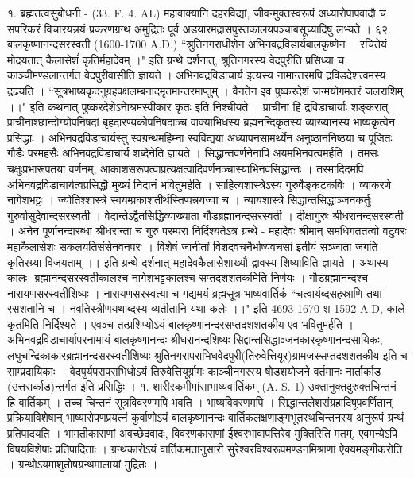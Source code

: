 १. ब्रह्मतत्वसुबोधनी - (33. F. 4. AL)
महावाक्यानि दहरविद्यां, जीवन्मुक्तस्वरूपं अध्यारोपापवादौ च सपरिकरं विचारयन्नयं प्रकरणग्रन्थ अमुद्रितः पूर्व अडयारमद्रासपुस्तकालयपञ्चाबसूच्यादिषु लभ्यते ।
६२. बालकृष्णानन्दसरस्वती (1600-1700 A.D.)
``श्रुतिनगराधीशेन अभिनवद्रविडार्यबालकृष्णेन । रचितेयं मोदयतात् कैलासेशंं कृतिर्महादेवम् ।" इति ग्रन्थे दर्शनात्, श्रुतिनगरस्य वेदपुरीति प्रसिध्या च काञ्चीमण्डलान्तर्गत वेदपुरीवासीति ज्ञायते । अभिनवद्रविडाचार्य इत्यस्य नामान्तरमपि द्रविडदेशत्वमस्य द्रढयति । 
``सूत्रभाष्यकृदनुग्रहपक्षलम्बनादमृतमान्तरमाप्तुम् ।
वैनतेन इव पुष्करदेशं जन्मयोगमतरं जलराशिम् ।।"
इति कथनात् पुष्करदेशेऽनेाश्रमस्वीकार कृतः इति निश्चीयते ।
प्राचीना हि द्रविडाचार्याः शङ्करात् प्राचीनाश्छान्दोग्योपनिषदां बृहदारण्यकोपनिषदाञ्च वाक्याभिधस्य ब्रह्मनन्दिकृतस्य व्याख्यानस्य भाष्यकृत्वेन प्रसिद्धाः । अभिनवद्रविडाचार्यस्तु स्वग्रन्थमहिम्ना स्वविद्यया अध्यापनसामर्थ्येन अनुष्ठाननिष्ठया च पूजितः गौडैः परमहंसैः अभिनवद्रविडाचार्य शब्देनेति ज्ञायते । सिद्धान्तवर्णनेनापि अयमभिनवत्वमर्हति । तमसः चक्षुःप्रभारूपतया वर्णनम्, आकाशसरूपत्वाप्रत्यक्षत्वादिवर्णनञ्चास्याभिनवसिद्धान्तः । तस्मादिदमपि अभिनवद्रविडाचार्यत्वप्रसिद्धौ मुख्यं निदानं भवितुमर्हति ।
साहित्यशास्त्रेऽस्य गुरुर्वेङ्कटकविः । व्याकरणे नागेशभट्टः । ज्योतिश्शास्त्रे स्वयम्प्रकाशतीर्थस्तिप्पन्नयज्वा च । न्यायशास्त्रे सिद्धान्तसिद्धाञ्जनकर्तुः गुरुर्वासुदेवान्दसरस्वती । वेदान्तेऽद्वैतसिद्धिव्याख्याता गौडब्रह्मानन्दसरस्वती । दीक्षागुरुः श्रीधरानन्दसरस्वती । अनेन पूर्णानन्दारब्धा श्रीधरान्ता च गुरु परम्परा निर्दिश्यतेऽत्र ग्रन्थे -
महादेवः श्रीमान् समधिगततत्वो वटुवरः 
महाकैलासेशः सकलयतिसंसेनवनपरः ।
विशेषं जानीतां विशदवचनैर्भाष्यवचसां
इतीयं सञ्जाता जगति कृतिरग्र्या विजयताम् ।।
इति ग्रन्थे दर्शनात् महादेवकैलासेशाख्यौ द्वावस्य शिष्याविति ज्ञायते ।
अथास्य कालः-
ब्रह्मानन्दसरस्वतीकालश्च नागेशभट्टकालश्च सप्तदशशतकमिति निर्णयः । गौडब्रह्मानन्दश्च नारायणसरस्वतीशिष्यः । नारायणसरस्वत्या च गद्यमयं व्रह्मसूत्र भाष्यवार्तिकं ``चत्वार्यब्दसहस्राणि तथा रसशतानि च । नवतिस्त्रीणयथाब्दस्य व्यतीतानि यथा कलेः ।।" इति 4693-1670 श 1592 A.D, काले कृतमिति निर्दिश्यते । एवञ्च तत्प्रशिप्योऽयं बालकृष्णानन्दरसप्तदशशतकीय एव भवितुमर्हति ।
अभिनवद्रविडाचार्यापरनामायं बालकृष्णानन्दः श्रीधरानन्दशिष्यः सिद्दान्तसिद्धाञ्जनकारकृष्णानन्दसायिकः, लघुचन्द्रिकाकारब्रह्मानन्दसरस्वतीशिष्यः श्रुतिनगरापराभिधवेदपुरी(तिरुवेत्तियूर)ग्रामजस्सप्तदशशतकीय इति च साम्प्रदायिकाः । वेदपुर्यपरापराभिधोऽयं तिरुवेत्तियूर्ग्रामः काञ्चीनगरस्य षोडशयोजने वर्तमानः नार्तार्काड (उत्तरार्काड)न्तर्गत इति प्रसिद्धिः ।
१. शारीरकमीमांसाभाष्यवार्तिकम् (A. S. 1)
उक्तानुक्तदुरुक्तचिन्तनं हि वार्तिकम् । तच्च चिन्तनं सूत्रविवरणमपि भवति । भाष्यविवरणमपि । सिद्धान्तलेशसंग्रहादिषूपवर्णितान् प्रक्रियाविशेषान् भाष्यारोपणप्रयत्नं कुर्वाणोऽयं बालकृष्णानन्दः वार्तिकलक्षणाङ्गभूतस्थचिन्तनस्य अनुरूपं ग्रन्थं प्रतिपादयति । भामतीकाराणां अवच्छेदवादः, विवरणकाराणां ईश्वरभावापत्तिरेव मुक्तिरिति मतम्, एवमन्येऽपि विषयविशेषाः प्रतिपादिताः । ग्रन्थकारोऽयं वार्तिकमतानुसारी सुरेश्वरविश्वरूपमण्डनमिश्राणां ऐक्यमङ्गीकरोति । ग्रन्थोऽयमाशुतोषग्रन्थमालायां मुद्रितः ।
